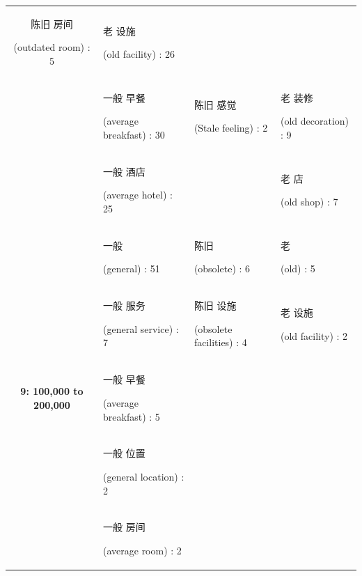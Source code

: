 \documentclass[smallextended,natbib]{svjour3}       %
\begin{document}
\begin{landscape}
\begin{table}[p]
{\begin{tabular}{|c|l|l|l|}
          \begin{CJK}{UTF8}{gbsn}陈旧 房间\end{CJK} (outdated room) : 5 &
          \begin{CJK}{UTF8}{gbsn}老 设施\end{CJK} (old facility) : 26 \\
         &
          \begin{CJK}{UTF8}{gbsn}一般 早餐\end{CJK} (average breakfast) : 30 &
          \begin{CJK}{UTF8}{gbsn}陈旧 感觉\end{CJK} (Stale feeling) : 2 &
          \begin{CJK}{UTF8}{gbsn}老 装修\end{CJK} (old decoration) : 9 \\
         &
          \begin{CJK}{UTF8}{gbsn}一般 酒店\end{CJK} (average hotel) : 25 &
           &
          \begin{CJK}{UTF8}{gbsn}老 店\end{CJK} (old shop) : 7 \\ \hline
        \multirow{5}{*}{\textbf{9: 100,000 to 200,000}} &
          \begin{CJK}{UTF8}{gbsn}一般\end{CJK} (general) : 51 &
          \begin{CJK}{UTF8}{gbsn}陈旧\end{CJK} (obsolete) : 6 &
          \begin{CJK}{UTF8}{gbsn}老\end{CJK} (old) : 5 \\
         &
          \begin{CJK}{UTF8}{gbsn}一般 服务\end{CJK} (general service) : 7 &
          \begin{CJK}{UTF8}{gbsn}陈旧 设施\end{CJK} (obsolete facilities) : 4 &
          \begin{CJK}{UTF8}{gbsn}老 设施\end{CJK} (old facility) : 2 \\
         &
          \begin{CJK}{UTF8}{gbsn}一般 早餐\end{CJK} (average breakfast) : 5 &
           &
           \\
         &
          \begin{CJK}{UTF8}{gbsn}一般 位置\end{CJK} (general location) : 2 &
           &
           \\
         &
          \begin{CJK}{UTF8}{gbsn}一般 房间\end{CJK} (average room) : 2 &
           &
           \\ \hline
        \end{tabular}%
        }
    \end{table}
    \end{landscape}
\end{document}
